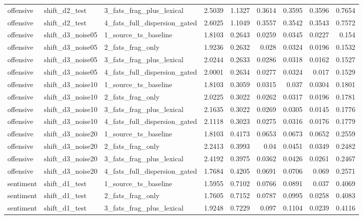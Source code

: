\begin{table}[htbp]
{\begin{tabular}{lllrrrrrr}
offensive & shift\_d2\_test & 3\_fats\_frag\_plus\_lexical & 2.5039 & 1.1327 & 0.3614 & 0.3595 & 0.3596 & 0.7654 \\
offensive & shift\_d2\_test & 4\_fats\_full\_dispersion\_gated & 2.6025 & 1.1049 & 0.3557 & 0.3542 & 0.3543 & 0.7572 \\
offensive & shift\_d3\_noise05 & 1\_source\_ts\_baseline & 1.8103 & 0.2643 & 0.0259 & 0.0345 & 0.0227 & 0.154 \\
offensive & shift\_d3\_noise05 & 2\_fats\_frag\_only & 1.9236 & 0.2632 & 0.028 & 0.0324 & 0.0196 & 0.1532 \\
offensive & shift\_d3\_noise05 & 3\_fats\_frag\_plus\_lexical & 2.0244 & 0.2633 & 0.0286 & 0.0318 & 0.0162 & 0.1527 \\
offensive & shift\_d3\_noise05 & 4\_fats\_full\_dispersion\_gated & 2.0001 & 0.2634 & 0.0277 & 0.0324 & 0.017 & 0.1529 \\
offensive & shift\_d3\_noise10 & 1\_source\_ts\_baseline & 1.8103 & 0.3059 & 0.0315 & 0.037 & 0.0304 & 0.1801 \\
offensive & shift\_d3\_noise10 & 2\_fats\_frag\_only & 2.0225 & 0.3022 & 0.0262 & 0.0317 & 0.0196 & 0.1781 \\
offensive & shift\_d3\_noise10 & 3\_fats\_frag\_plus\_lexical & 2.1635 & 0.3022 & 0.0269 & 0.0305 & 0.0145 & 0.1776 \\
offensive & shift\_d3\_noise10 & 4\_fats\_full\_dispersion\_gated & 2.1118 & 0.3023 & 0.0275 & 0.0316 & 0.0176 & 0.1779 \\
offensive & shift\_d3\_noise20 & 1\_source\_ts\_baseline & 1.8103 & 0.4173 & 0.0653 & 0.0673 & 0.0652 & 0.2559 \\
offensive & shift\_d3\_noise20 & 2\_fats\_frag\_only & 2.2413 & 0.3993 & 0.04 & 0.0451 & 0.0349 & 0.2482 \\
offensive & shift\_d3\_noise20 & 3\_fats\_frag\_plus\_lexical & 2.4192 & 0.3975 & 0.0362 & 0.0426 & 0.0261 & 0.2467 \\
offensive & shift\_d3\_noise20 & 4\_fats\_full\_dispersion\_gated & 1.7684 & 0.4205 & 0.0691 & 0.0706 & 0.069 & 0.2571 \\
sentiment & shift\_d1\_test & 1\_source\_ts\_baseline & 1.5955 & 0.7102 & 0.0766 & 0.0891 & 0.037 & 0.4069 \\
sentiment & shift\_d1\_test & 2\_fats\_frag\_only & 1.7605 & 0.7152 & 0.0787 & 0.0995 & 0.0258 & 0.4083 \\
sentiment & shift\_d1\_test & 3\_fats\_frag\_plus\_lexical & 1.9248 & 0.7229 & 0.097 & 0.1104 & 0.0239 & 0.4116 \\

\end{tabular}}
\end{table}
